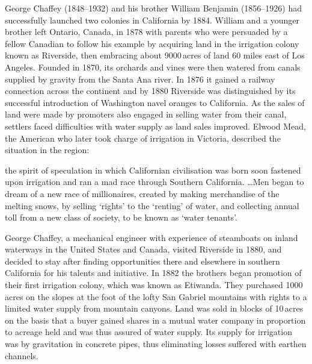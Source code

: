 George Chaffey (1848--1932) and his brother William Benjamin
(1856--1926) had successfully laun\-ch\-ed two colonies in California
by 1884.  William and a younger brother left Ontario, Canada, in 1878
with parents who were persuaded by a fellow Canadian to follow his
example by acquiring land in the irrigation colony known as Riverside,
 then embracing about 9000\,acres of land
60 miles east of Los Angeles.  Founded in 1870, its
orchards and vines were then watered from
canals supplied by gravity from the Santa Ana
 river.  In 1876 it gained a
railway connection across the continent and
by 1880 Riverside was distinguished by its successful introduction of
Washington navel oranges to
California.  As the sales
of land were made by promoters also engaged in selling water from
their canal, settlers faced difficulties with water supply as land
sales improved.  Elwood Mead,  the
American who later took charge of irrigation in
Victoria, described the situation in the region:
\begin{Quote}
	the spirit of speculation in which Californian civilisation
	was born soon fastened upon irrigation and ran a mad race
	through Southern California. \ldots Men began to dream of a
	new race of millionaires, created by making merchandise of the
	melting snows, by selling `rights' to the `renting' of water,
	and collecting annual toll from a new class of society, to be
	known as `water tenants'.
\end{Quote}

George Chaffey,  a mechanical engineer with
experience of steamboats on inland waterways in the United
States and Canada, visited Riverside in 1880, and
decided to stay after finding opportunities there and elsewhere in
southern California for his talents and initiative.
In 1882 the brothers began promotion of their first irrigation colony,
which was known as Etiwanda. 
They purchased 1000\,acres on the slopes at the foot of the lofty San
Gabriel mountains with rights to a limited water supply from mountain
canyons.  Land was sold in blocks of 10\,acres on the basis that a
buyer gained shares in a mutual water company in proportion to acreage
held and was thus assured of water supply.  Its supply for irrigation
was by gravitation in concrete pipes,
thus eliminating losses suffered with earthen
channels.

